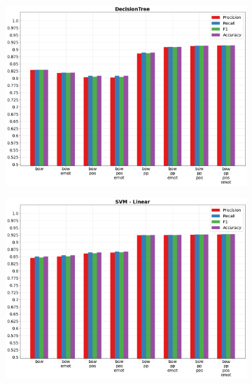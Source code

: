 \documentclass[oneside]{book}
\begin{document}
\begin{figure}[!h]
	\hspace*{-3cm}
	\begin{subfigure}[b]{0.5\textwidth}
		\centering
		\includegraphics[width=10cm]{assets/reports/macro/bow/DecisionTree.png}
	\end{subfigure}
	\hfill
	\begin{subfigure}[b]{0.5\textwidth}		
		\centering
		\hspace*{0.15cm}
		\includegraphics[width=10cm]{assets/reports/macro/bow/SVM - Linear.png}
	\end{subfigure}
\end{figure}
\newpage
\end{document}
